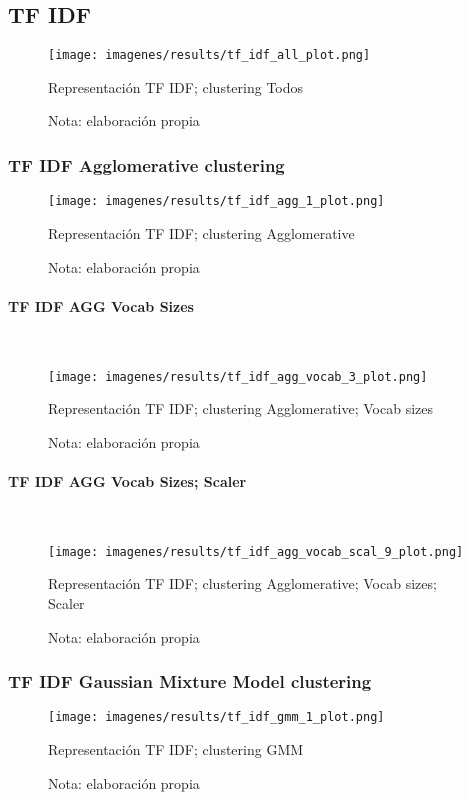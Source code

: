 \documentclass[12pt]{article}
\newcommand{\subsubsubsection}[1]{\paragraph{#1}\mbox{}\\}
\begin{document}
		\subsection{TF IDF}
		\begin{figure}[H]
			\texttt{[image: imagenes/results/tf\_idf\_all\_plot.png]}
			\centering
			\caption{Representación TF IDF; clustering Todos}
			\caption*{\small Nota:  elaboración propia}
			\label{fig:tfidf_all}
		\end{figure}
		
			\subsubsection{TF IDF Agglomerative clustering}
			\begin{figure}[H]
				\texttt{[image: imagenes/results/tf\_idf\_agg\_1\_plot.png]}
				\centering
				\caption{Representación TF IDF; clustering Agglomerative}
				\caption*{\small Nota:  elaboración propia}
				\label{fig:tfidf_agg_1}
			\end{figure}
			
				\subsubsubsection{TF IDF AGG Vocab Sizes}
				\begin{figure}[H]
					\texttt{[image: imagenes/results/tf\_idf\_agg\_vocab\_3\_plot.png]}
					\centering
					\caption{Representación TF IDF; clustering Agglomerative; Vocab sizes}
					\caption*{\small Nota:  elaboración propia}
					\label{fig:tfidf_agg_vocab_3}
				\end{figure}
							
				\subsubsubsection{TF IDF AGG Vocab Sizes; Scaler}
				\begin{figure}[H]
					\texttt{[image: imagenes/results/tf\_idf\_agg\_vocab\_scal\_9\_plot.png]}
					\centering
					\caption{Representación TF IDF; clustering Agglomerative; Vocab sizes; Scaler}
					\caption*{\small Nota:  elaboración propia}
					\label{fig:tfidf_agg_vocab_scal_9}
				\end{figure}
							
			\subsubsection{TF IDF Gaussian Mixture Model clustering}
			\begin{figure}[H]
				\texttt{[image: imagenes/results/tf\_idf\_gmm\_1\_plot.png]}
				\centering
				\caption{Representación TF IDF; clustering GMM}
				\caption*{\small Nota:  elaboración propia}
				\label{fig:tfidf_gmm_1}
			\end{figure}
			
\end{document}
